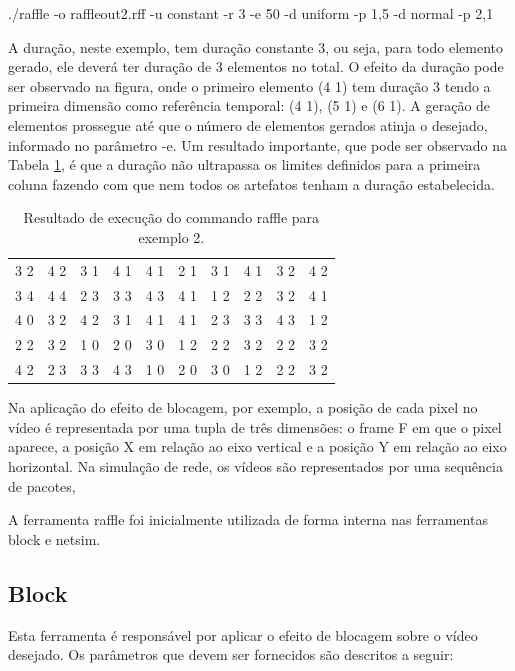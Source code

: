./raffle -o raffleout2.rff -u constant -r 3 -e 50 -d uniform -p 1,5 -d normal -p 2,1

A duração, neste exemplo, tem duração constante 3, ou seja, para todo elemento gerado, ele deverá ter duração de 3 elementos no total. O efeito da duração pode ser observado na figura, onde o primeiro elemento (4 1) tem duração 3 tendo a primeira dimensão como referência temporal: (4 1), (5 1) e (6 1). A geração de elementos prossegue até que o número de elementos gerados atinja o desejado, informado no parâmetro -e. Um resultado importante, que pode ser observado na Tabela \ref{tab:raffleresult2}, é que a duração não ultrapassa os limites definidos para a primeira coluna fazendo com que nem todos os artefatos tenham a duração estabelecida.

\begin{table}[!h]
	\centering
	\caption{Resultado de execução do commando raffle para exemplo 2.}
	\label{tab:raffleresult2}
	\begin{tabular}{|l|l|l|l|l|l|l|l|l|l|}
		\hline
		3 2 & 4 2 & 3 1 & 4 1 & 4 1 & 2 1 & 3 1 & 4 1 & 3 2 & 4 2 \\
		3 4 & 4 4 & 2 3 & 3 3 & 4 3 & 4 1 & 1 2 & 2 2 & 3 2 & 4 1 \\
		4 0 & 3 2 & 4 2 & 3 1 & 4 1 & 4 1 & 2 3 & 3 3 & 4 3 & 1 2 \\
		2 2 & 3 2 & 1 0 & 2 0 & 3 0 & 1 2 & 2 2 & 3 2 & 2 2 & 3 2 \\
		4 2 & 2 3 & 3 3 & 4 3 & 1 0 & 2 0 & 3 0 & 1 2 & 2 2 & 3 2 \\
		\hline
	\end{tabular}
\end{table}

Na aplicação do efeito de blocagem, por exemplo, a posição de cada pixel no vídeo é representada por uma tupla de três dimensões: o frame F em que o pixel aparece, a posição X em relação ao eixo vertical e a posição Y em relação ao eixo horizontal. Na simulação de rede, os vídeos são representados por uma sequência de pacotes,

A ferramenta raffle foi inicialmente utilizada de forma interna nas ferramentas block e netsim. %

\subsection{Block}

Esta ferramenta é responsável por aplicar o efeito de blocagem sobre o vídeo desejado. Os parâmetros que devem ser fornecidos são descritos a seguir:


